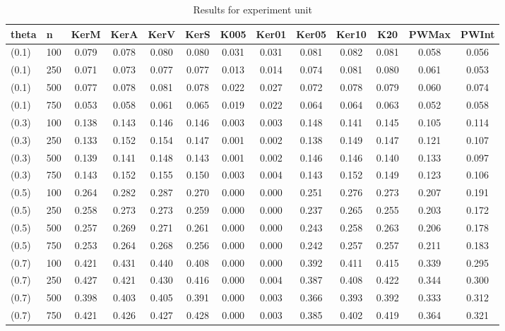     \begin{table}[ht]
    \centering
    
    \caption{Results for experiment unit}
    \tiny{
\begin{tabular}{ll|ccccccccccc}
\hline
theta & n & KerM & KerA & KerV & KerS & K005 & Ker01 & Ker05 & Ker10 & K20 & PWMax & PWInt \\
\hline
(0.1) & 100 & 0.079 & 0.078 & 0.080 & 0.080 & 0.031 & 0.031 & 0.081 & 0.082 & 0.081 & 0.058 & 0.056 \\
(0.1) & 250 & 0.071 & 0.073 & 0.077 & 0.077 & 0.013 & 0.014 & 0.074 & 0.081 & 0.080 & 0.061 & 0.053 \\
(0.1) & 500 & 0.077 & 0.078 & 0.081 & 0.078 & 0.022 & 0.027 & 0.072 & 0.078 & 0.079 & 0.060 & 0.074 \\
(0.1) & 750 & 0.053 & 0.058 & 0.061 & 0.065 & 0.019 & 0.022 & 0.064 & 0.064 & 0.063 & 0.052 & 0.058 \\
(0.3) & 100 & 0.138 & 0.143 & 0.146 & 0.146 & 0.003 & 0.003 & 0.148 & 0.141 & 0.145 & 0.105 & 0.114 \\
(0.3) & 250 & 0.133 & 0.152 & 0.154 & 0.147 & 0.001 & 0.002 & 0.138 & 0.149 & 0.147 & 0.121 & 0.107 \\
(0.3) & 500 & 0.139 & 0.141 & 0.148 & 0.143 & 0.001 & 0.002 & 0.146 & 0.146 & 0.140 & 0.133 & 0.097 \\
(0.3) & 750 & 0.143 & 0.152 & 0.155 & 0.150 & 0.003 & 0.004 & 0.143 & 0.152 & 0.149 & 0.123 & 0.106 \\
(0.5) & 100 & 0.264 & 0.282 & 0.287 & 0.270 & 0.000 & 0.000 & 0.251 & 0.276 & 0.273 & 0.207 & 0.191 \\
(0.5) & 250 & 0.258 & 0.273 & 0.273 & 0.259 & 0.000 & 0.000 & 0.237 & 0.265 & 0.255 & 0.203 & 0.172 \\
(0.5) & 500 & 0.257 & 0.269 & 0.271 & 0.261 & 0.000 & 0.000 & 0.243 & 0.258 & 0.263 & 0.206 & 0.178 \\
(0.5) & 750 & 0.253 & 0.264 & 0.268 & 0.256 & 0.000 & 0.000 & 0.242 & 0.257 & 0.257 & 0.211 & 0.183 \\
(0.7) & 100 & 0.421 & 0.431 & 0.440 & 0.408 & 0.000 & 0.000 & 0.392 & 0.411 & 0.415 & 0.339 & 0.295 \\
(0.7) & 250 & 0.427 & 0.421 & 0.430 & 0.416 & 0.000 & 0.004 & 0.387 & 0.408 & 0.422 & 0.344 & 0.300 \\
(0.7) & 500 & 0.398 & 0.403 & 0.405 & 0.391 & 0.000 & 0.003 & 0.366 & 0.393 & 0.392 & 0.333 & 0.312 \\
(0.7) & 750 & 0.421 & 0.426 & 0.427 & 0.428 & 0.000 & 0.003 & 0.385 & 0.402 & 0.419 & 0.364 & 0.321 \\

\end{tabular}}
\end{table}
